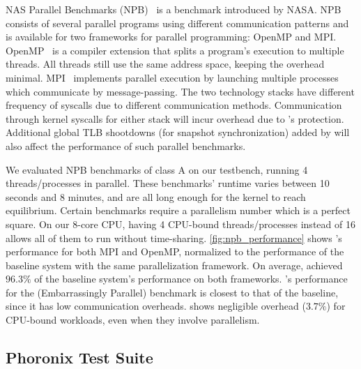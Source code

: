 \documentclass[letterpaper,twocolumn,10pt, anonymous]{article}
\begin{document}
NAS Parallel Benchmarks (NPB)~\cite{npb} is a benchmark introduced by
NASA. 
NPB consists of several parallel programs using different communication
patterns and is available for two frameworks for parallel programming:
OpenMP and MPI.
OpenMP~\cite{dagum1998openmp} is a compiler extension that splits a 
program's execution to multiple threads. 
All threads still use the same address space, keeping the overhead minimal. 
MPI~\cite{snir1998mpi} implements parallel execution by launching multiple
processes which communicate by message-passing. 
The two technology stacks have different frequency of syscalls due to 
different communication methods.
Communication through kernel syscalls for either stack will incur overhead
due to \tiktok's protection.
Additional global TLB shootdowns (for snapshot synchronization) added by 
\tiktok will also affect the performance of such parallel benchmarks.

We evaluated NPB benchmarks of class A on our testbench, running 
4 threads/processes in parallel.
These benchmarks' runtime varies between 10 seconds and 8 minutes, 
and are all long enough for the kernel to reach equilibrium.
Certain benchmarks require a parallelism number which is a perfect square.
On our 8-core CPU, having 4 CPU-bound threads/processes instead of 16 allows 
all of them to run without time-sharing.
\autoref{fig:npb_performance} shows \tiktok's performance for both MPI and OpenMP,
normalized to the performance of the baseline system with the same parallelization
framework.
On average, \tiktok achieved $96.3\%$ of the baseline system's performance on 
both frameworks. 
\tiktok's performance for the  (Embarrassingly Parallel) benchmark is 
closest to that of the baseline, since it has low communication overheads.
\tiktok shows negligible overhead ($3.7\%$) for CPU-bound workloads, even when they 
involve parallelism.


\subsection{Phoronix Test Suite}
\end{document}
